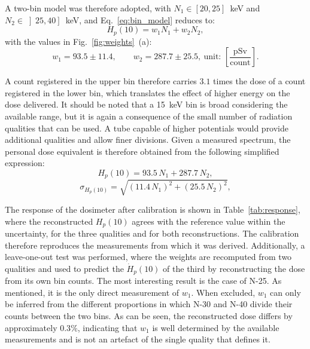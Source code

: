 A two-bin model was therefore adopted, with $N_1 \in \left[20,25\right]$~keV and $N_2 \in \left]25,40\right]$~keV, and Eq.~\ref{eq:bin_model} reduces to:
\begin{equation}
H_p(10) = w_1 N_1 + w_2 N_2 ,
\label{eq:two_bin}
\end{equation}
with the values in Fig.~\ref{fig:weights}~(a):
\begin{equation}
w_1 = 93.5 \pm 11.4, \qquad w_2 = 287.7 \pm 25.5,\ \text{unit: } \left[\frac{\mathrm{pSv}}{\mathrm{count}}\right] .
\label{eq:weights}
\end{equation}
 
\noindent A count registered in the upper bin therefore carries $3.1$ times the dose of a count registered in the lower bin, which translates the effect of higher energy on the dose delivered. It should be noted that a 15~keV bin is broad considering the available range, but it is again a consequence of the small number of radiation qualities that can be used. A tube capable of higher potentials would provide additional qualities and allow finer divisions. Given a measured spectrum, the personal dose equivalent is therefore obtained from the following simplified expression:
\begin{equation}
    H_p(10) = 93.5\,N_1 + 287.7\,N_2 ,
    \label{eq:dose_conversion}
\end{equation}
\begin{equation}
    \sigma_{H_p(10)} = \sqrt{\left(11.4\,N_1\right)^2 + \left(25.5\,N_2\right)^2} ,
    \label{eq:dose_uncertainty}
\end{equation}

The response of the dosimeter after calibration is shown in Table~\ref{tab:response}, where the reconstructed ${H}_p(10)$ agrees with the reference value within the uncertainty, for the three qualities and for both reconstructions. The calibration therefore reproduces the measurements from which it was derived. Additionally, a leave-one-out test was performed, where the weights are recomputed from two qualities and used to predict the $\dot{H}_p(10)$ of the third by reconstructing the dose from its own bin counts. The most interesting result is the case of N-25. As mentioned, it is the only direct measurement of $w_1$. When excluded, $w_1$ can only be inferred from the different proportions in which N-30 and N-40 divide their counts between the two bins. As can be seen, the reconstructed dose differs by approximately $0.3\%$, indicating that $w_1$ is well determined by the available measurements and is not an artefact of the single quality that defines it.

